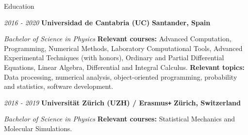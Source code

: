 \documentclass{resume}
\def\Plus{\texttt{+}}
\begin{document}
\begin{rSection}{{\large Education}}
\vspace{2pt}

\begin{adjustwidth}{-6mm}{0pt}
\small{\em{2016 - 2020}}
\normalsize
\hspace{5pt}
{\bf Universidad de Cantabria (UC)} \hfill {\bf Santander, Spain}
\end{adjustwidth}
\vspace{-7pt}
\begin{adjustwidth}{15mm}{0pt}\textit{Bachelor of Science in Physics}
\newline
{\bf Relevant courses: }Advanced Computation, Programming, Numerical Methods, Laboratory Computational Tools, Advanced Experimental Techniques (with honors), Ordinary and Partial Differential Equations, Linear Algebra, Differential and Integral Calculus.
\newline
{\bf Relevant topics: }Data processing, numerical analysis, object-oriented programming, probability and statistics, software development.
\end{adjustwidth}

\begin{adjustwidth}{-6mm}{0pt}
\small{\em{2018 - 2019}}
\normalsize
\hspace{5pt}
{\bf Universit{\"a}t Z{\"u}rich (UZH) / Erasmus\Plus} \hfill {\bf Z{\"u}rich, Switzerland}
\end{adjustwidth}
\vspace{-7pt}
\begin{adjustwidth}{15mm}{0pt}\textit{Bachelor of Science in Physics}
\newline
{\bf Relevant courses: }Statistical Mechanics and Molecular Simulations.
\end{adjustwidth}
\end{rSection}
\end{document}
